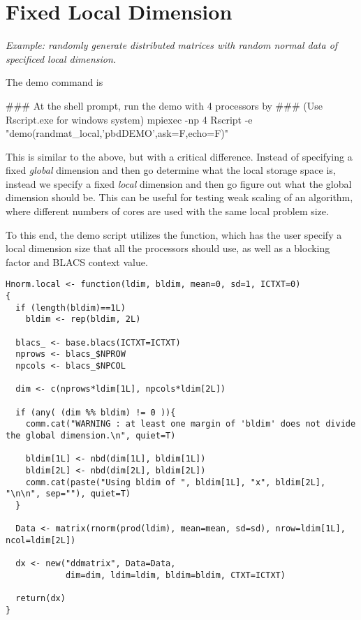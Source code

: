 \section{Fixed Local Dimension}

\emph{Example:  randomly generate distributed matrices with random normal data of specificed local dimension.}

The demo command is
\begin{Command}
### At the shell prompt, run the demo with 4 processors by
### (Use Rscript.exe for windows system)
mpiexec -np 4 Rscript -e "demo(randmat_local,'pbdDEMO',ask=F,echo=F)"
\end{Command}

This is similar to the above, but with a critical difference.  Instead of specifying a fixed \emph{global} dimension and then go determine what the local storage space is, instead we specify a fixed \emph{local} dimension and then go figure out what the global dimension should be.  This can be useful for testing weak scaling of an algorithm, where different numbers of cores are used with the same local problem size.

To this end, the demo script utilizes the  function, which has the user specify a local dimension size that all the processors should use, as well as a blocking factor and BLACS context value.  

\begin{lstlisting}[language=rr,title=Hnorm.local()]
Hnorm.local <- function(ldim, bldim, mean=0, sd=1, ICTXT=0)
{
  if (length(bldim)==1L)
    bldim <- rep(bldim, 2L)
  
  blacs_ <- base.blacs(ICTXT=ICTXT)
  nprows <- blacs_$NPROW
  npcols <- blacs_$NPCOL
  
  dim <- c(nprows*ldim[1L], npcols*ldim[2L])
  
  if (any( (dim %% bldim) != 0 )){
    comm.cat("WARNING : at least one margin of 'bldim' does not divide the global dimension.\n", quiet=T)
    
    bldim[1L] <- nbd(dim[1L], bldim[1L])
    bldim[2L] <- nbd(dim[2L], bldim[2L])
    comm.cat(paste("Using bldim of ", bldim[1L], "x", bldim[2L], "\n\n", sep=""), quiet=T)
  }
  
  Data <- matrix(rnorm(prod(ldim), mean=mean, sd=sd), nrow=ldim[1L], ncol=ldim[2L])
  
  dx <- new("ddmatrix", Data=Data,
            dim=dim, ldim=ldim, bldim=bldim, CTXT=ICTXT)
  
  return(dx)
}
\end{lstlisting}

